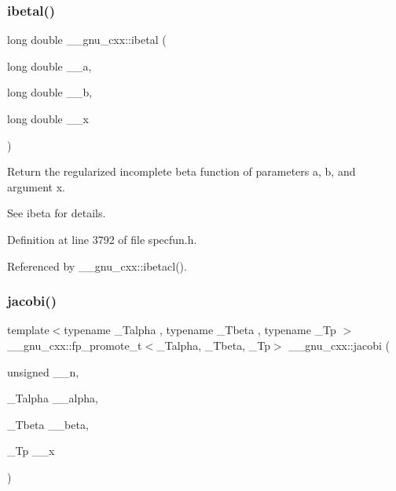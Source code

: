 \subsubsection{\texorpdfstring{ibetal()}{ibetal()}}
{\footnotesize\ttfamily long double \+\_\+\+\_\+gnu\+\_\+cxx\+::ibetal (\begin{DoxyParamCaption}\item[{long double}]{\+\_\+\+\_\+a,  }\item[{long double}]{\+\_\+\+\_\+b,  }\item[{long double}]{\+\_\+\+\_\+x }\end{DoxyParamCaption})\hspace{0.3cm}{\ttfamily [inline]}}

Return the regularized incomplete beta function of parameters {\ttfamily a}, {\ttfamily b}, and argument {\ttfamily x}.

See ibeta for details. 

Definition at line 3792 of file specfun.\+h.



Referenced by \+\_\+\+\_\+gnu\+\_\+cxx\+::ibetacl().

\mbox{\label{group__mathsf__gnu_gad54f6601748324d268532138eb38ca33}} 
\subsubsection{\texorpdfstring{jacobi()}{jacobi()}}
{\footnotesize\ttfamily template$<$typename \+\_\+\+Talpha , typename \+\_\+\+Tbeta , typename \+\_\+\+Tp $>$ \\
\+\_\+\+\_\+gnu\+\_\+cxx\+::fp\+\_\+promote\+\_\+t$<$\+\_\+\+Talpha, \+\_\+\+Tbeta, \+\_\+\+Tp$>$ \+\_\+\+\_\+gnu\+\_\+cxx\+::jacobi (\begin{DoxyParamCaption}\item[{unsigned}]{\+\_\+\+\_\+n,  }\item[{\+\_\+\+Talpha}]{\+\_\+\+\_\+alpha,  }\item[{\+\_\+\+Tbeta}]{\+\_\+\+\_\+beta,  }\item[{\+\_\+\+Tp}]{\+\_\+\+\_\+x }\end{DoxyParamCaption})\hspace{0.3cm}{\ttfamily [inline]}}


